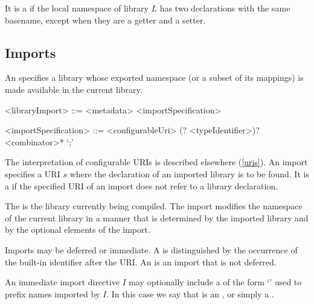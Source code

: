 \documentclass[makeidx]{article}
\begin{document}
\LMHash{}%
It is a  if the local namespace of library $L$
has two declarations with the same basename,
except when they are a getter and a setter.



\subsection{Imports}

\LMHash{}%
An  specifies a library whose exported namespace
(or a subset of its mappings) is made available in the current library.

\begin{grammar}
<libraryImport> ::= <metadata> <importSpecification>

<importSpecification> ::= \gnewline{}
  \IMPORT{} <configurableUri>
  (\DEFERRED? \AS{} <typeIdentifier>)?
  <combinator>* `;'
\end{grammar}

\LMHash{}%
The interpretation of configurable URIs is described elsewhere
(\ref{uris}).
An import specifies a URI $s$
where the declaration of an imported library is to be found.
It is a  if the specified URI of an import
does not refer to a library declaration.

\LMHash{}%
The  is the library currently being compiled.
The import modifies the namespace of the current library
in a manner that is determined by the imported library and
by the optional elements of the import.

\LMHash{}%
Imports may be deferred or immediate.
A
is distinguished by the occurrence of
the built-in identifier \DEFERRED{} after the URI.
An
is an import that is not deferred.

\LMHash{}%
An immediate import directive $I$ may optionally include
a  of the form `\code{\AS\,\,\id}' used to prefix
names imported by $I$.
In this case we say that \id{} is an ,
or simply a .

\end{document}
